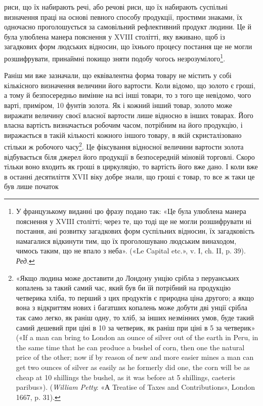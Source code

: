 риси, що їх набирають речі, або речові риси, що їх набирають
суспільні визначення праці на основі певного способу продукції,
простими знаками, їх одночасно проголошується за самовільний
рефлективний продукт людини. Це й була улюблена манера
пояснення у XVIII столітті, яку вживано, щоб із загадкових
форм людських відносин, що їхнього процесу постання ще не
могли розшифрувати, принаймні покищо зняти подобу чогось
незрозумілого\footnote*{
У французькому виданні цю фразу подано так: «Це була улюблена
манера пояснення у XVIII столітті; через те, що тоді ще не могли розшифрувати
ні постання, ані розвитку загадкових форм суспільних відносин,
їх загадковість намагалися відкинути тим, що їх проголошувано
людським винаходом, чимось таким, що не впало з неба». («Le Capital
etc.», v. І, ch. II, p. 39). \emph{Ред.}
}.

Раніш ми вже зазначали, що еквівалентна форма товару не
містить у собі кількісного визначення величини його вартости.
Коли відомо, що золото є гроші, а тому й безпосередньо вимінне
на всі інші товари, то з того ще невідомо, чого варті, приміром,
10 фунтів золота. Як і кожний інший товар, золото може виражати
величину своєї власної вартости лише відносно в інших товарах.
Його власна вартість визначається робочим часом, потрібним
на його продукцію, і виражається в такій кількості кожного
іншого товару, в якій скристалізовано стільки ж робочого часу\footnote{
«Якщо людина може доставити до Лондону унцію срібла з перуанських
копалень за такий самий час, який був би їй потрібний на продукцію
четверика хліба, то перший з цих продуктів є природна ціна другого;
а якщо вона з відкриттям нових і багатших копалень може добути дві
унції срібла так само легко, як раніш одну, то хліб, за інших незмінних
умов, буде такий самий дешевий при ціні в 10 за четверик, як
раніш при ціні в 5 за четверик» («If a man can bring to London
an ounce of silver out of the earth in Peru, in the same time that he can
produce a bushel of corn, then one the natural price of the other; now if
by reason of new and more easier mines a man can get two ounces of silver
as easily as he formerly did one, the corn will be as cheap at 10 shillings
the bushel, as it was before at 5 shillings, caeteris paribus»). (\emph{William
Petty}: «А Treatise of Taxes and Contributions», London 1667, p. 31).
}.
Це фіксування відносної величини вартости золота відбувається
біля джерел його продукції в безпосередній міновій торговлі.
Скоро тільки воно входить як гроші в циркуляцію, то вартість
його вже дано. І коли вже в останні десятиліття XVII віку
добре знали, що гроші є товар, то все ж таки це був лише початок
\parbreak{}  %
